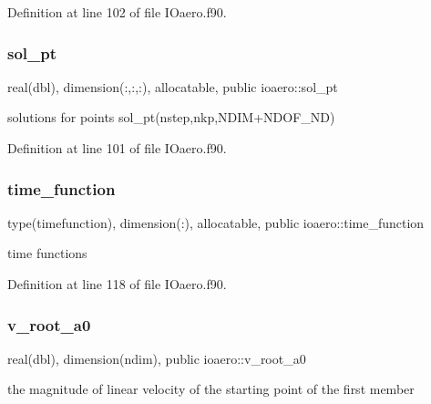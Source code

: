 Definition at line 102 of file I\+Oaero.\+f90.

\mbox{\label{namespaceioaero_af6e62942bb38b7b7d69ea25972fe00bf}} 
\subsubsection{\texorpdfstring{sol\+\_\+pt}{sol\_pt}}
{\footnotesize\ttfamily real(dbl), dimension(\+:,\+:,\+:), allocatable, public ioaero\+::sol\+\_\+pt}



solutions for points sol\+\_\+pt(nstep,nkp,N\+D\+I\+M+\+N\+D\+O\+F\+\_\+\+ND) 



Definition at line 101 of file I\+Oaero.\+f90.

\mbox{\label{namespaceioaero_accb03392882ddfd413b5ac9ce3be09c6}} 
\subsubsection{\texorpdfstring{time\+\_\+function}{time\_function}}
{\footnotesize\ttfamily type(timefunction), dimension(\+:), allocatable, public ioaero\+::time\+\_\+function}



time functions 



Definition at line 118 of file I\+Oaero.\+f90.

\mbox{\label{namespaceioaero_a3cefdbd9d62bffe41f44b7f79f321f67}} 
\subsubsection{\texorpdfstring{v\+\_\+root\+\_\+a0}{v\_root\_a0}}
{\footnotesize\ttfamily real(dbl), dimension(ndim), public ioaero\+::v\+\_\+root\+\_\+a0}



the magnitude of linear velocity of the starting point of the first member 



